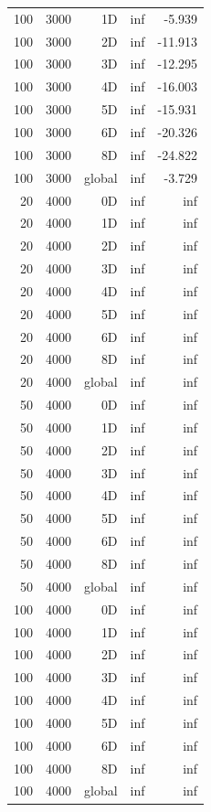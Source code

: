 \begin{longtable}{rrrrr}
100 & 3000 & 1D & inf & -5.939 \\
100 & 3000 & 2D & inf & -11.913 \\
100 & 3000 & 3D & inf & -12.295 \\
100 & 3000 & 4D & inf & -16.003 \\
100 & 3000 & 5D & inf & -15.931 \\
100 & 3000 & 6D & inf & -20.326 \\
100 & 3000 & 8D & inf & -24.822 \\
100 & 3000 & global & inf & -3.729 \\
20 & 4000 & 0D & inf & inf \\
20 & 4000 & 1D & inf & inf \\
20 & 4000 & 2D & inf & inf \\
20 & 4000 & 3D & inf & inf \\
20 & 4000 & 4D & inf & inf \\
20 & 4000 & 5D & inf & inf \\
20 & 4000 & 6D & inf & inf \\
20 & 4000 & 8D & inf & inf \\
20 & 4000 & global & inf & inf \\
50 & 4000 & 0D & inf & inf \\
50 & 4000 & 1D & inf & inf \\
50 & 4000 & 2D & inf & inf \\
50 & 4000 & 3D & inf & inf \\
50 & 4000 & 4D & inf & inf \\
50 & 4000 & 5D & inf & inf \\
50 & 4000 & 6D & inf & inf \\
50 & 4000 & 8D & inf & inf \\
50 & 4000 & global & inf & inf \\
100 & 4000 & 0D & inf & inf \\
100 & 4000 & 1D & inf & inf \\
100 & 4000 & 2D & inf & inf \\
100 & 4000 & 3D & inf & inf \\
100 & 4000 & 4D & inf & inf \\
100 & 4000 & 5D & inf & inf \\
100 & 4000 & 6D & inf & inf \\
100 & 4000 & 8D & inf & inf \\
100 & 4000 & global & inf & inf \\
\end{longtable}
